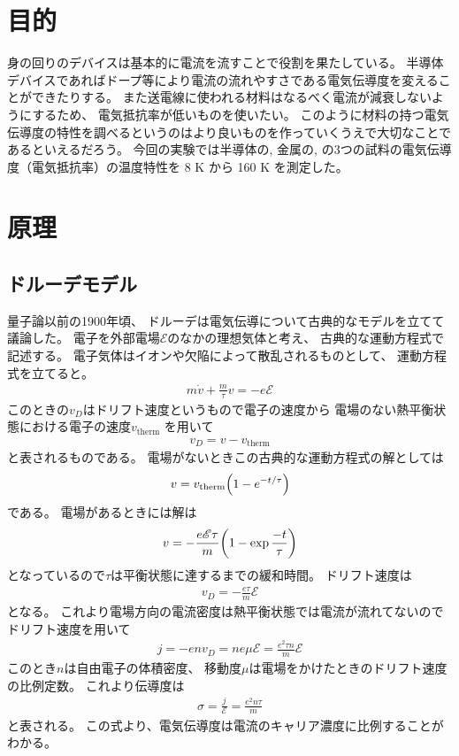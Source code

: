 \documentclass[11pt,dvipdfmx,a4paper]{jsarticle}
\begin{document}
\section{目的}
身の回りのデバイスは基本的に電流を流すことで役割を果たしている。
半導体デバイスであればドープ等により電流の流れやすさである電気伝導度を変えることができたりする。
また送電線に使われる材料はなるべく電流が減衰しないようにするため、
電気抵抗率が低いものを使いたい。
このように材料の持つ電気伝導度の特性を調べるというのはより良いものを作っていくうえで大切なことであるといえるだろう。
今回の実験では半導体の, 金属の,  の3つの試料の電気伝導度（電気抵抗率）の温度特性を 8 K から 160 K を測定した。


\section{原理}
\subsection{ドルーデモデル}
量子論以前の1900年頃、
ドルーデは電気伝導について古典的なモデルを立てて議論した。
電子を外部電場\(\mathscr{E}\)のなかの理想気体と考え、
古典的な運動方程式で記述する。
電子気体はイオンや欠陥によって散乱されるものとして、
運動方程式を立てると。
\begin{align}
    m\dot{v} + \frac{m}{\tau}v = -e\mathscr{E} %
\end{align}
このときの\(v_D\)はドリフト速度というもので電子の速度から
電場のない熱平衡状態における電子の速度\(v_{\text{therm}}\)
を用いて
\begin{align}
    v_D= v-v_{\text{therm}}
\end{align}
と表されるものである。
電場がないときこの古典的な運動方程式の解としては
\begin{align}
    v = v_{\text{therm}}\qty(1-e^{-t/\tau})
\end{align}
である。
電場があるときには解は
\begin{align}
    v = -\frac{e\mathscr{E}\tau}{m}\qty(1-\exp\frac{-t}{\tau})
\end{align}
となっているので\(\tau\)は平衡状態に達するまでの緩和時間。
ドリフト速度は
\begin{align}
    v_D=-\frac{e\tau}{m}\mathscr{E} %
\end{align}
となる。
これより電場方向の電流密度は熱平衡状態では電流が流れてないのでドリフト速度を用いて
\begin{align}
    j = -env_D = ne\mu\mathscr{E} = \frac{e^2\tau n}{m}\mathscr{E} %
\end{align}
このとき\(n\)は自由電子の体積密度、
移動度\(\mu\)は電場をかけたときのドリフト速度の比例定数。
これより伝導度は
\begin{align}
    \sigma = \frac{j}{\mathscr{E}} = \frac{e^2n\tau}{m} %
\end{align}
と表される。
この式より、電気伝導度は電流のキャリア濃度に比例することがわかる。
\end{document}
